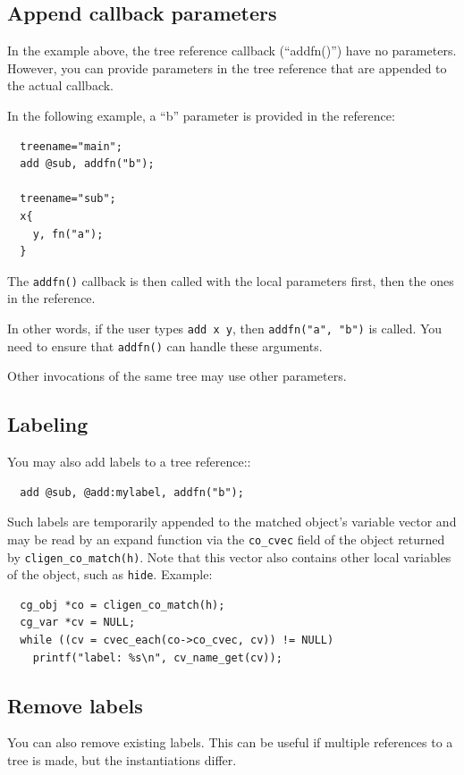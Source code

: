 \documentclass[a4paper, 10pt] {article}
\begin{document}
\subsection{Append callback parameters}

In the example above, the tree reference callback (``addfn()'') have no parameters. However, you can provide parameters in the tree reference that are appended to the actual callback.

In the following example, a ``b'' parameter is provided in the reference:
\begin{verbatim}
  treename="main";
  add @sub, addfn("b");

  treename="sub";
  x{
    y, fn("a");
  }
\end{verbatim}

The {\tt addfn()} callback is then called with the local parameters first, then the ones in the reference.

In other words, if the user types {\tt add x y}, then {\tt addfn("a", "b")} is called. You need to ensure that {\tt addfn()} can handle these arguments.

Other invocations of the same tree may use other parameters.

\subsection{Labeling}

You may also add labels to a tree reference::
\begin{verbatim}
  add @sub, @add:mylabel, addfn("b");
\end{verbatim}

Such labels are temporarily appended to the matched object's variable
vector and may be read by an expand function via the {\tt co\_cvec}
field of the object returned by {\tt cligen\_co\_match(h)}. Note that
this vector also contains other local variables of the object, such as
{\tt hide}. Example:
\begin{verbatim}
  cg_obj *co = cligen_co_match(h);
  cg_var *cv = NULL;
  while ((cv = cvec_each(co->co_cvec, cv)) != NULL)
    printf("label: %s\n", cv_name_get(cv));
\end{verbatim}

\subsection{Remove labels}

You can also remove existing labels. This can be useful if multiple references to a tree is made, but the instantiations differ.
\end{document}
